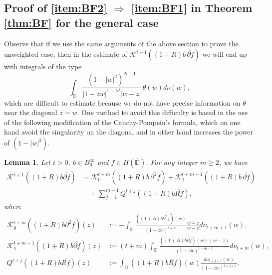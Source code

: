 \documentclass[12pt,twoside,leqno,final]{amsart}
\theoremstyle{plain}
\newtheorem{lem}[thm]{Lemma}
\begin{document}
\subsection{Proof of \eqref{item:BF2} $\Longrightarrow$ \eqref{item:BF1}  in Theorem \ref{thm:BF} for the general case}\quad\par

Observe that if we   use the same arguments of the above section to prove the unweighted case, 
then in the estimate of ${{\mathcal K}}^{t+1}((1+R)b\,\overline{{\partial} f})$ we will end up with integrals of the type 
$$
\int_{{\mathbb D}} \frac{(1-|w|^2)^{N-1}}{|1-z\overline w|^{1+M}|w-z|}\,\theta(w) d\nu(w),
$$
which are difficult to estimate because we do not have precise information on $\theta$ near  the diagonal $z=w$.
One method to avoid this difficulty is based in the use of the following modification of the Cauchy-Pompeiu's formula, 
which on one hand avoid the singularity on the diagonal and in other hand increases the power of $(1-|w|^2)$.  

\begin{lem}\label{lem:KN}  
Let $t> 0$, $b\in B^\infty_0$ and $f\in H(\overline{{\mathbb D}})$. 
For any integer $m\ge 2$, we have 
\begin{align*}
{{\mathcal K}}^{t+1}((1+R)b\overline {{\partial} f})
&={{\mathcal K}}^{t+m}_0((1+R)b\,\overline {{\partial}^2 f})
+{{\mathcal K}}^{t+m-1}_1((1+R)b\,\overline {{\partial} f})\\
&\quad +\sum_{j=1}^{m-1} Q^{t+j}((1+R)b\overline {R f}),
\end{align*}
where  
\begin{align*}
{{\mathcal K}}^{t+m}_0((1+R)b\overline {{\partial}^2 f})(z)
&:=-\int_{{\mathbb D}} \frac{((1+R)b\overline{{\partial}^2 f})(w)}{(1-z\overline w)^{t+m}}\frac{\overline{w-z}}{w-z}d\nu_{t+m+1}(w),\\
{{\mathcal K}}^{t+m-1}_1((1+R)b\overline {{\partial} f})(z)
&:=(t+m)\int_{{\mathbb D}} \frac{((1+R)b\overline{{\partial} f})(w)\,(\overline{w-z})}{(1-z\overline w)^{t+m+1}}d\nu_{t+m}(w),\\
Q^{t+j}((1+R)b\overline {R f})(z)&:=
\int_{{\mathbb D}} ((1+R)b \overline{R f})(w)\frac{d\nu_{t+j+1}(w)}{(1-z\overline w)^{t+j+1}}.
\end{align*} 
\end{lem}
\end{document}
